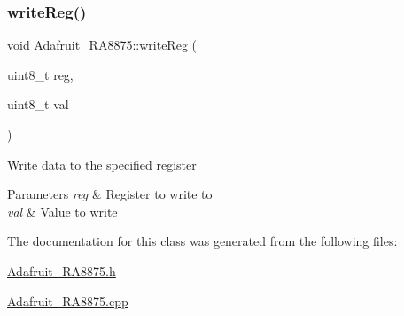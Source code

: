 \subsubsection{\texorpdfstring{writeReg()}{writeReg()}}
{\footnotesize\ttfamily void Adafruit\+\_\+\+R\+A8875\+::write\+Reg (\begin{DoxyParamCaption}\item[{uint8\+\_\+t}]{reg,  }\item[{uint8\+\_\+t}]{val }\end{DoxyParamCaption})}

Write data to the specified register


\begin{DoxyParams}{Parameters}
{\em reg} & Register to write to \\
\hline
{\em val} & Value to write \\
\hline
\end{DoxyParams}


The documentation for this class was generated from the following files\+:\begin{DoxyCompactItemize}
\item 
\mbox{\hyperlink{_adafruit___r_a8875_8h}{Adafruit\+\_\+\+R\+A8875.\+h}}\item 
\mbox{\hyperlink{_adafruit___r_a8875_8cpp}{Adafruit\+\_\+\+R\+A8875.\+cpp}}\end{DoxyCompactItemize}
